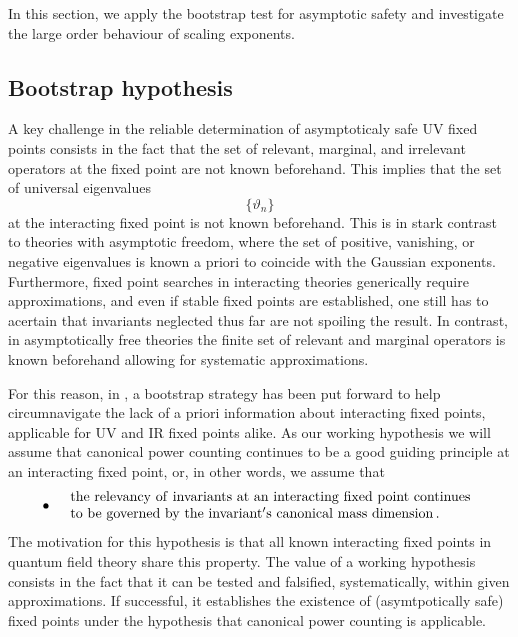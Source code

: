 \documentclass[notitlepage,eqsecnum,bm,amsmath,preprintnumbers,superscriptaddress,nofootinbib,aps,11pt]{revtex4-1}
\def\beq{\begin{equation}}
\def\eeq{\end{equation}}
\begin{document}
In this section, we apply the bootstrap test for asymptotic safety \cite{Falls:2013bv} and  investigate the large order behaviour of scaling exponents.

\subsection{Bootstrap hypothesis}
A key challenge in the reliable determination of asymptoticaly safe UV fixed points consists in the fact that the set of relevant, marginal, and irrelevant operators at the fixed point are not known beforehand. This implies that the set of universal eigenvalues
\beq
\{\vartheta_n\}
\eeq
at the interacting fixed point  is not known beforehand. This is in stark contrast to theories with asymptotic freedom, where the set of positive, vanishing, or negative eigenvalues is known a priori to coincide with the Gaussian exponents. Furthermore, fixed point searches in interacting theories generically require approximations, and even if stable fixed points are established, one still has to acertain that invariants neglected thus far are not spoiling the result. In contrast, in asymptotically free theories the finite  set of relevant and marginal operators is known beforehand allowing for systematic approximations.

For this reason, in \cite{Falls:2013bv}, a bootstrap strategy has been put forward to help circumnavigate the lack of a priori information about interacting fixed points, applicable for UV and IR fixed points alike. As our working hypothesis we will assume that canonical power counting continues to be a good guiding principle at an interacting fixed point, or, in other words, we assume that
\begin{equation}\label{hypo}
\bullet 
\begin{array}{rl}
&{\rm 
the\ relevancy\ of\ invariants\ at\ an\ interacting\ fixed\ point\ continues}\\ &{\rm to\ be\ governed\ by\ the\ invariant's\ canonical\ mass\ dimension}\,.
\end{array}
\end{equation}
The motivation for this hypothesis is that all known interacting fixed points in quantum field theory share this property. The value of a working hypothesis consists in the fact that it can be tested and falsified, systematically, within given approximations. If successful, it establishes the existence of (asymtpotically safe) fixed points under the hypothesis that canonical power counting is applicable.
\end{document}
